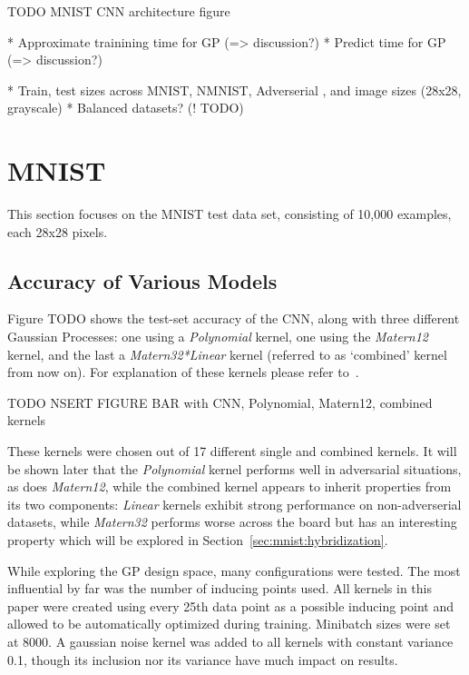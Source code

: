 \documentclass{article}
\begin{document}
TODO MNIST CNN architecture figure

 * Approximate trainining time for GP (=> discussion?)
 * Predict time for GP (=> discussion?)


* Train, test sizes across MNIST, NMNIST, Adverserial \cite{papernot2016cleverhans}, and image sizes (28x28, grayscale)
* Balanced datasets? (! TODO)



\section{MNIST}
\label{sec:mnist}
This section focuses on the MNIST test data set, consisting of 10,000 examples, each 28x28 pixels.

\subsection{Accuracy of Various Models}
\label{sec:mnist:acc}

Figure TODO shows the test-set accuracy of the CNN, along with three different Gaussian Processes: one using a \textit{Polynomial} kernel, one using the \textit{Matern12} kernel, and the last a \textit{Matern32*Linear} kernel (referred to as `combined' kernel from now on). For explanation of these kernels please refer to~\citet*{mussen2004gaussian}.

TODO NSERT FIGURE BAR with CNN, Polynomial, Matern12, combined kernels

These kernels were chosen out of 17 different single and combined kernels. It will be shown later that the \textit{Polynomial} kernel performs well in adversarial situations, as does \textit{Matern12}, while the combined kernel appears to inherit properties from its two components: \textit{Linear} kernels exhibit strong performance on non-adverserial datasets, while \textit{Matern32} performs worse across the board but has an interesting property which will be explored in Section~\ref{sec:mnist:hybridization}.

While exploring the GP design space, many configurations were tested. The most influential by far was the number of inducing points used. All kernels in this paper were created using every 25th data point as a possible inducing point and allowed to be automatically optimized during training. Minibatch sizes were set at 8000. A gaussian noise kernel was added to all kernels with constant variance 0.1, though its inclusion nor its variance have much impact on results.
\end{document}
